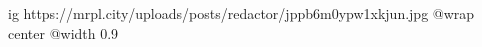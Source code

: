  
 
 
 
 

\ifcmt
  ig https://mrpl.city/uploads/posts/redactor/jppb6m0ypw1xkjun.jpg
  @wrap center
  @width 0.9
\fi
